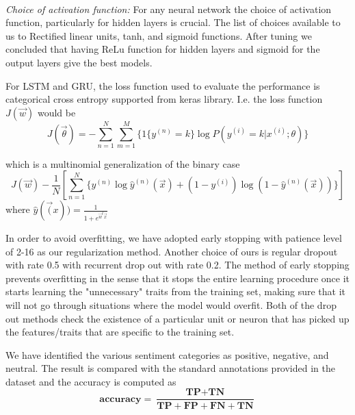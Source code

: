 \documentclass[comsoc,conference]{IEEEtran}
\begin{document}
\\ \emph{Choice of activation function:}
For any neural network the choice of activation function, particularly for hidden layers is crucial. The list of choices available to us to Rectified linear units, tanh, and sigmoid functions. After tuning we concluded that having ReLu function for hidden layers and sigmoid for the output layers give the best models.
\par For LSTM and GRU, the loss function used to evaluate the performance is categorical cross entropy supported from keras library. I.e. the loss function $J(\vec{w})$ would be
\[
J(\vec{\theta}) = - \sum_{n=1}^N\sum_{m=1}^M\{1\{y^{(n)}=k\}\log P(y^{(i)} = k|x^{(i)}; \theta)\}
\]

which is a multinomial generalization of the binary case
\[
J(\vec{w})- \frac{1}{N} [ \sum_{n=1}^N \{y^{(n)} \log \hat{y}^{(n)}(\vec{x}) + (1-y^{(i)})\log(1-\hat{y}^{(n)}(\vec{x})) \}]
\]
where $\hat{y}(\vec(x)) = \frac{1}{1+e^{\vec{w}^t\vec{x}}}$

In order to avoid overfitting, we have adopted early stopping with patience level of 2-16 as our regularization method. Another choice of ours is regular dropout with rate 0.5 with recurrent drop out with rate 0.2. The method of early stopping prevents overfitting in the sense that it stops the entire learning procedure once it starts learning the "unnecessary" traits from the training set, making sure that it will not go through situations where the model would overfit. Both of the drop out methods check the existence of a particular unit or neuron that has picked up the features/traits that are specific to the training set.

We have identified the various sentiment categories as positive, negative, and neutral. The result is compared with the standard annotations provided in the dataset and the accuracy is computed as
$$
\textbf{accuracy} = \frac{\textbf{TP}+\textbf{TN}}{\textbf{TP}+\textbf{FP}+\textbf{FN}+\textbf{TN}}
$$
\end{document}
